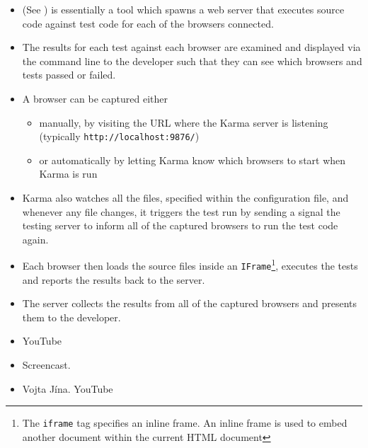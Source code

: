 
\begin{itemize}
\item
{} (See 
)
is essentially a tool which spawns a web server that executes source
code against test code for each of the browsers connected. 

\item
The results
for each test against each browser are examined and displayed via the
command line to the developer such that they can see which browsers and
tests passed or failed.

\item
A browser can be captured either
  \begin{itemize}
  \item
  manually, by visiting the URL where the Karma server is listening (typically \verb|http://localhost:9876/|)
  \item
  or automatically by letting Karma know which browsers to start when Karma is run 
  \end{itemize}
\end{itemize}

\begin{itemize}
\item
Karma also watches all the files, specified within the configuration file,
and whenever any file changes, it triggers the test run by sending a
signal the testing server to inform all of the captured browsers to run
the test code again. 
\item
Each browser then loads the source files inside an
\verb|IFrame|\footnote{The {\tt iframe} tag specifies an inline frame.  
An inline frame is used to embed another document within the current HTML document}, 
executes the tests and reports the results back to the server.
\item
The server collects the results from all of the captured browsers and presents them to the developer.
\end{itemize}

\begin{itemize}
\item
{} YouTube
\item
{} Screencast.
\item
{} Vojta Jína. YouTube
\end{itemize}

